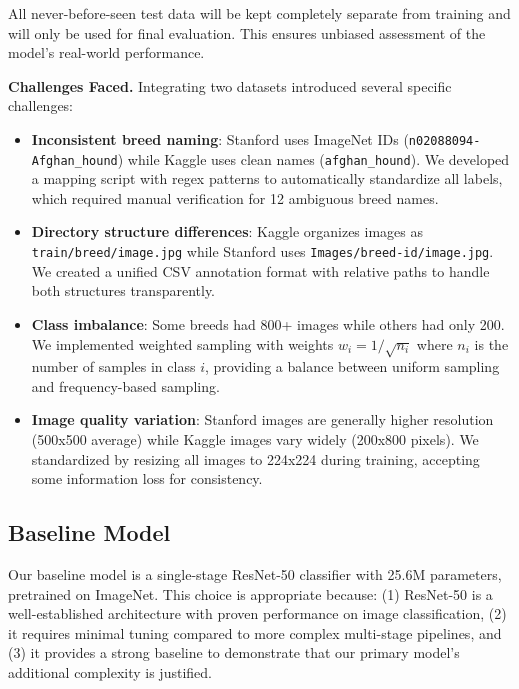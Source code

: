 \documentclass[final]{article}
\begin{document}
All never-before-seen test data will be kept completely separate from training and will only be used for final evaluation. This ensures unbiased assessment of the model's real-world performance.

\textbf{Challenges Faced.} Integrating two datasets introduced several specific challenges:

\begin{itemize}
    \item \textbf{Inconsistent breed naming}: Stanford uses ImageNet IDs (\texttt{n02088094-Afghan\_hound}) while Kaggle uses clean names (\texttt{afghan\_hound}). We developed a mapping script with regex patterns to automatically standardize all labels, which required manual verification for 12 ambiguous breed names.
    
    \item \textbf{Directory structure differences}: Kaggle organizes images as \texttt{train/breed/image.jpg} while Stanford uses \texttt{Images/breed-id/image.jpg}. We created a unified CSV annotation format with relative paths to handle both structures transparently.
    
    \item \textbf{Class imbalance}: Some breeds had 800+ images while others had only 200. We implemented weighted sampling with weights $w_i = 1/\sqrt{n_i}$ where $n_i$ is the number of samples in class $i$, providing a balance between uniform sampling and frequency-based sampling.
    
    \item \textbf{Image quality variation}: Stanford images are generally higher resolution (500x500 average) while Kaggle images vary widely (200x800 pixels). We standardized by resizing all images to 224x224 during training, accepting some information loss for consistency.
\end{itemize}

\subsection*{Baseline Model}

Our baseline model is a single-stage ResNet-50 classifier with 25.6M parameters, pretrained on ImageNet. This choice is appropriate because: (1) ResNet-50 is a well-established architecture with proven performance on image classification, (2) it requires minimal tuning compared to more complex multi-stage pipelines, and (3) it provides a strong baseline to demonstrate that our primary model's additional complexity is justified.
\end{document}
